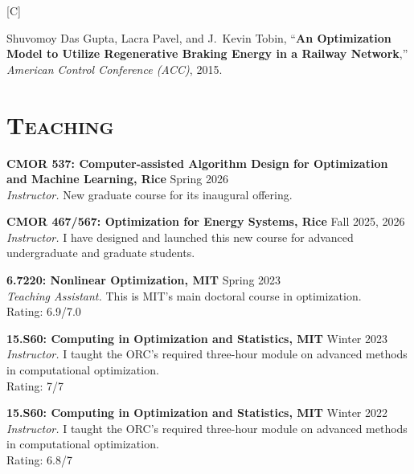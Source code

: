\documentclass[margin,line,pifont]{./FontsAndCls/custom_res}
\newcounter{publication}
\newlength{\publicationitemsep}
\newenvironment{publicationlist}[1]{%
  \setlength{\publicationitemsep}{\parskip}%
  \begin{list}{[#1\arabic{publication}]}{%
    \usecounter{publication}%
    \setlength{\labelwidth}{2.5em}%
    \setlength{\labelsep}{0.5em}%
    \setlength{\leftmargin}{\dimexpr\labelwidth+\labelsep\relax}%
    \setlength{\rightmargin}{0pt}%
    \setlength{\itemindent}{0pt}%
    \setlength{\listparindent}{0pt}%
    \setlength{\itemsep}{\publicationitemsep}%
    \setlength{\parsep}{0pt}%
    \setlength{\topsep}{0pt}%
    \setlength{\partopsep}{0pt}%
    \renewcommand{\makelabel}[1]{\hfil\normalfont ##1}%
  }%
}{\end{list}}
\begin{document}
\begin{resume}
\begin{publicationlist}{C}
\item \begin{minipage}[t]{\linewidth}
Shuvomoy Das Gupta, Lacra Pavel, and J.\ Kevin Tobin, ``\textbf{An Optimization Model to Utilize Regenerative Braking Energy in a Railway Network},'' \textit{American Control Conference (ACC)}, 2015. \\
\end{minipage}
\end{publicationlist}


\section{ \bfseries\scshape Teaching}
{\textbf{CMOR 537: Computer-assisted Algorithm Design for Optimization and Machine Learning, Rice} }  \hfill Spring 2026  \\
\textit{Instructor.} New graduate course for its inaugural offering.


{\textbf{CMOR 467/567: Optimization for Energy Systems, Rice} }  \hfill Fall 2025, 2026  \\
\textit{Instructor.} I have designed and launched this new course for advanced undergraduate and graduate students.


{\textbf{6.7220: Nonlinear Optimization, MIT} }  \hfill Spring 2023  \\
\textit{ Teaching Assistant.} This is MIT's main doctoral course in optimization.\\
{\sc Rating:} 6.9/7.0

{\textbf{15.S60: Computing in Optimization and Statistics, MIT} } \hfill Winter 2023\\
\textit{Instructor.} I taught the ORC's required three-hour module on advanced methods in computational optimization. \\
{\sc Rating:} 7/7

{\textbf{15.S60: Computing in Optimization and Statistics, MIT} } \hfill Winter 2022\\
\textit{Instructor.} I taught the ORC's required three-hour module on advanced methods in computational optimization. \\
{\sc Rating:} 6.8/7


\end{resume}
\end{document}
